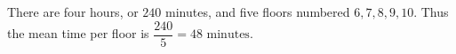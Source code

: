 There are four hours, or $240$ minutes, and five floors numbered $6,7,8,9,10$. Thus the mean time per floor is $\dfrac{240}{5}=\boxed{48\text{ minutes}}$.
